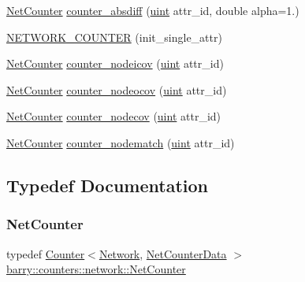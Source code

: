 \begin{DoxyCompactItemize}
\item 
\hyperlink{namespacebarry_1_1counters_1_1network_a067bd9de04608fc2e1586324d3864a45}{Net\+Counter} \hyperlink{namespacebarry_1_1counters_1_1network_a03bd4bb3270e9386dfaefcae818f216a}{counter\+\_\+absdiff} (\hyperlink{namespacebarry_a11dfc53ddb4672278319aa04f1e09a6c}{uint} attr\+\_\+id, double alpha=1.)
\item 
\hyperlink{namespacebarry_1_1counters_1_1network_a7649cd035af193258a69058aea425941}{N\+E\+T\+W\+O\+R\+K\+\_\+\+C\+O\+U\+N\+T\+ER} (init\+\_\+single\+\_\+attr)
\item 
\hyperlink{namespacebarry_1_1counters_1_1network_a067bd9de04608fc2e1586324d3864a45}{Net\+Counter} \hyperlink{namespacebarry_1_1counters_1_1network_aeb0f972d3a2c2ebfcc736edb1f6cb46e}{counter\+\_\+nodeicov} (\hyperlink{namespacebarry_a11dfc53ddb4672278319aa04f1e09a6c}{uint} attr\+\_\+id)
\item 
\hyperlink{namespacebarry_1_1counters_1_1network_a067bd9de04608fc2e1586324d3864a45}{Net\+Counter} \hyperlink{namespacebarry_1_1counters_1_1network_aad6440a640edda2f4c217f218b570c91}{counter\+\_\+nodeocov} (\hyperlink{namespacebarry_a11dfc53ddb4672278319aa04f1e09a6c}{uint} attr\+\_\+id)
\item 
\hyperlink{namespacebarry_1_1counters_1_1network_a067bd9de04608fc2e1586324d3864a45}{Net\+Counter} \hyperlink{namespacebarry_1_1counters_1_1network_a68a87af025966df3b0aa3f22217f43bd}{counter\+\_\+nodecov} (\hyperlink{namespacebarry_a11dfc53ddb4672278319aa04f1e09a6c}{uint} attr\+\_\+id)
\item 
\hyperlink{namespacebarry_1_1counters_1_1network_a067bd9de04608fc2e1586324d3864a45}{Net\+Counter} \hyperlink{namespacebarry_1_1counters_1_1network_aca093c21b831f7f775cf9861ef0a5f9d}{counter\+\_\+nodematch} (\hyperlink{namespacebarry_a11dfc53ddb4672278319aa04f1e09a6c}{uint} attr\+\_\+id)
\end{DoxyCompactItemize}


\subsection{Typedef Documentation}
\mbox{\label{namespacebarry_1_1counters_1_1network_a067bd9de04608fc2e1586324d3864a45}} 
\subsubsection{\texorpdfstring{Net\+Counter}{NetCounter}}
{\footnotesize\ttfamily typedef \hyperlink{classbarry_1_1_counter}{Counter}$<$\hyperlink{namespacebarry_1_1counters_1_1network_a4cb88d4572ded3b447ea269c9cd0b2c0}{Network}, \hyperlink{classbarry_1_1counters_1_1network_1_1_net_counter_data}{Net\+Counter\+Data} $>$ \hyperlink{namespacebarry_1_1counters_1_1network_a067bd9de04608fc2e1586324d3864a45}{barry\+::counters\+::network\+::\+Net\+Counter}}



